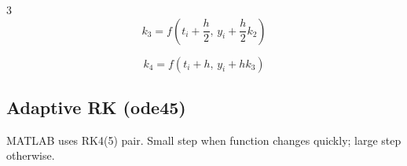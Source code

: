 \documentclass[9pt,a4paper]{article}
\begin{document}
\begin{multicols}{3}
\[
k_3 = f\!\left(t_i + \frac{h}{2},\, y_i + \frac{h}{2}k_2\right)
\]

\[
k_4 = f(t_i + h,\, y_i + hk_3)
\]


\subsection{Adaptive RK (ode45)}
MATLAB uses RK4(5) pair.  
Small step when function changes quickly; large step otherwise.











\end{multicols}
\end{document}
